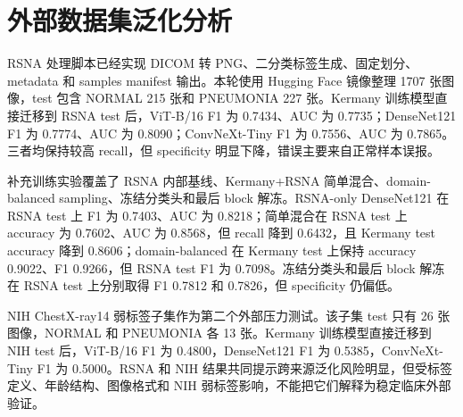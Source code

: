 \chapter{外部数据集泛化分析}

RSNA 处理脚本已经实现 DICOM 转 PNG、二分类标签生成、固定划分、metadata 和 samples manifest 输出。本轮使用 Hugging Face 镜像整理 1707 张图像，test 包含 NORMAL 215 张和 PNEUMONIA 227 张。Kermany 训练模型直接迁移到 RSNA test 后，ViT-B/16 F1 为 0.7434、AUC 为 0.7735；DenseNet121 F1 为 0.7774、AUC 为 0.8090；ConvNeXt-Tiny F1 为 0.7556、AUC 为 0.7865。三者均保持较高 recall，但 specificity 明显下降，错误主要来自正常样本误报。

补充训练实验覆盖了 RSNA 内部基线、Kermany+RSNA 简单混合、domain-balanced sampling、冻结分类头和最后 block 解冻。RSNA-only DenseNet121 在 RSNA test 上 F1 为 0.7403、AUC 为 0.8218；简单混合在 RSNA test 上 accuracy 为 0.7602、AUC 为 0.8568，但 recall 降到 0.6432，且 Kermany test accuracy 降到 0.8606；domain-balanced 在 Kermany test 上保持 accuracy 0.9022、F1 0.9266，但 RSNA test F1 为 0.7098。冻结分类头和最后 block 解冻在 RSNA test 上分别取得 F1 0.7812 和 0.7826，但 specificity 仍偏低。

NIH ChestX-ray14 弱标签子集作为第二个外部压力测试。该子集 test 只有 26 张图像，NORMAL 和 PNEUMONIA 各 13 张。Kermany 训练模型直接迁移到 NIH test 后，ViT-B/16 F1 为 0.4800，DenseNet121 F1 为 0.5385，ConvNeXt-Tiny F1 为 0.5000。RSNA 和 NIH 结果共同提示跨来源泛化风险明显，但受标签定义、年龄结构、图像格式和 NIH 弱标签影响，不能把它们解释为稳定临床外部验证。
